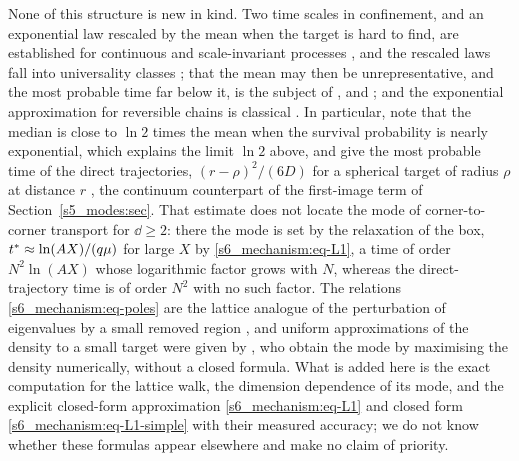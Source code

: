 None of this structure is new in kind. Two time scales in confinement, and an exponential law rescaled by the mean
when the target is hard to find, are established for continuous and scale-invariant processes
\citep{Benichou2010,GodecMetzler2016}, and the rescaled laws fall into universality classes \citep{Meyer2011}; that the
mean may then be unrepresentative, and the most probable time far below it, is the subject of \citet{Mattos2012},
\citet{GodecMetzler2016} and \citet{Grebenkov2018}; and the exponential approximation for reversible chains is classical
\citep{AldousBrown1992}. In particular, \citet[Eq.~(31)]{Grebenkov2018} note that the median is close to $\ln2$ times the
mean when the survival probability is nearly exponential, which explains the limit $\ln2$ above, and give the
most probable time of the direct trajectories, $(r-\rho)^{2}/(6D)$ for a spherical target of radius $\rho$ at distance
$r$ \citep[Eq.~(3)]{Grebenkov2018}, the continuum counterpart of the first-image term of Section~\ref{s5_modes:sec}.
That estimate does not locate the mode of corner-to-corner transport for $\dd\ge2$: there the mode is set by the
relaxation of the box, $t^{*}\approx\ln(AX)/(q\mu)$ for large $X$ by \eqref{s6_mechanism:eq-L1}, a time of order
$N^{2}\ln(AX)$ whose logarithmic factor grows with $N$, whereas the direct-trajectory time is of order $N^{2}$ with no
such factor. The relations
\eqref{s6_mechanism:eq-poles} are the lattice analogue of the perturbation of eigenvalues by a small removed region
\citep{WardKeller1993}, and uniform approximations of the density to a small target were given by
\citet{IsaacsonNewby2013}, who obtain the mode by maximising the density numerically, without a closed formula.
What is added here is the exact computation for the lattice walk, the dimension dependence of its mode, and the explicit
closed-form approximation \eqref{s6_mechanism:eq-L1} and closed form \eqref{s6_mechanism:eq-L1-simple} with their
measured accuracy; we do not know whether these formulas appear elsewhere and make no claim of priority.

